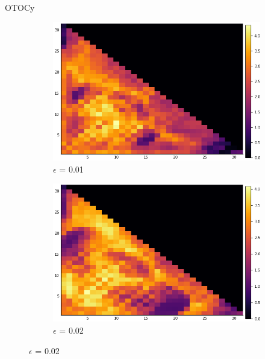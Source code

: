 \documentclass{article}
\begin{document}
\begin{section}{OTOCy}
\begin{figure}[H]
\begin{subfigure}{.33\textwidth}
                                \end{subfigure}%
                                \begin{subfigure}{.33\textwidth}
                                  \centering
                                  \includegraphics[width=1.0\linewidth]{HM2.png}
                                  \caption{$\epsilon$ = 0.01}
    
    
                                \end{subfigure}%
                                \begin{subfigure}{.33\textwidth}
                                  \centering
                                  \includegraphics[width=1.0\linewidth]{HM3.png}
                                  \caption{$\epsilon$ = 0.02}
    
                                \end{subfigure}%
    

\end{figure}
\end{section}
\end{document}
